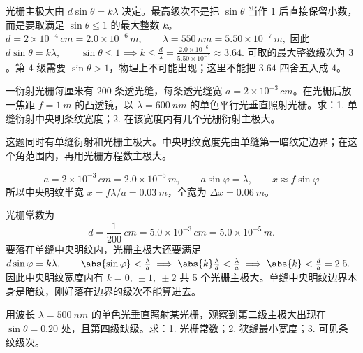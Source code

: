 \documentclass[lang=cn,11pt]{elegantbook}
\begin{document}
\begin{solution}
光栅主极大由 \(d\sin\theta=k\lambda\) 决定。最高级次不是把 \(\sin\theta\) 当作 \(1\) 后直接保留小数，而是要取满足 \(\sin\theta\le1\) 的最大整数 \(k\)。
 \(d=2\times10^{-4}\,\si{cm}=2.0\times10^{-6}\,\si{m}, \qquad \lambda=550\,\si{nm}=5.50\times10^{-7}\,\si{m},\) 
因此
 \(d\sin\theta=k\lambda,\qquad \sin\theta\le1 \implies k\le\frac{d}{\lambda} =\frac{2.0\times10^{-6}}{5.50\times10^{-7}}\approx3.64.\) 
可取的最大整数级次为 \(3\)。第 \(4\) 级需要 \(\sin\theta>1\)，物理上不可能出现；这里不能把 \(3.64\) 四舍五入成 \(4\)。
\end{solution}

\begin{exercise}
一衍射光栅每厘米有 \(200\) 条透光缝，每条透光缝宽 \(a=2\times10^{-3}\,\si{cm}\)。在光栅后放一焦距 \(f=\SI{1}{m}\) 的凸透镜，以 \(\lambda=\SI{600}{nm}\) 的单色平行光垂直照射光栅。求：1. 单缝衍射中央明条纹宽度；2. 在该宽度内有几个光栅衍射主极大。
\end{exercise}

\begin{solution}
这题同时有单缝衍射和光栅主极大。中央明纹宽度先由单缝第一暗纹定边界；在这个角范围内，再用光栅方程数主极大。

\[
a=2\times10^{-3}\,\si{cm}=2.0\times10^{-5}\,\si{m},\qquad
a\sin\varphi=\lambda,\qquad
x\approx f\sin\varphi
\]
所以中央明纹半宽 \(x=f\lambda/a=\SI{0.03}{m}\)，全宽为 \(\Delta x=\SI{0.06}{m}\)。

光栅常数为
\[
d=\frac{1}{200}\,\si{cm}=5.0\times10^{-3}\,\si{cm}=5.0\times10^{-5}\,\si{m}.
\]
要落在单缝中央明纹内，光栅主极大还要满足
 \(d\sin\varphi=k\lambda,\qquad \abs{\sin\varphi}<\frac{\lambda}{a} \implies \abs{k}\frac{\lambda}{d}<\frac{\lambda}{a} \implies \abs{k}<\frac{d}{a}=2.5.\) 
因此中央明纹宽度内有 \(k=0,\ \pm1,\ \pm2\) 共 5 个光栅主极大。单缝中央明纹边界本身是暗纹，刚好落在边界的级次不能算进去。
\end{solution}

\begin{exercise}[第二级出现在 \(\sin\theta=0.20\) 且第四级缺级时怎样反推光栅参数]
用波长 \(\lambda=\SI{500}{nm}\) 的单色光垂直照射某光栅，观察到第二级主极大出现在 \(\sin\theta=0.20\) 处，且第四级缺级。求：1. 光栅常数；2. 狭缝最小宽度；3. 可见条纹级次。
\end{exercise}
\end{document}
